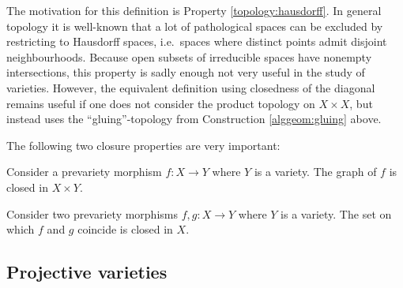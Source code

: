     \begin{remark}
        The motivation for this definition is Property \ref{topology:hausdorff}. In general topology it is well-known that a lot of pathological spaces can be excluded by restricting to Hausdorff spaces, i.e.~spaces where distinct points admit disjoint neighbourhoods. Because open subsets of irreducible spaces have nonempty intersections, this property is sadly enough not very useful in the study of varieties. However, the equivalent definition using closedness of the diagonal remains useful if one does not consider the product topology on $X\times X$, but instead uses the ``gluing''-topology from Construction \ref{alggeom:gluing} above.
    \end{remark}

    The following two closure properties are very important:
    \begin{property}\label{alggeom:closed_graph}
        Consider a prevariety morphism $f:X\rightarrow Y$ where $Y$ is a variety. The graph of $f$ is closed in $X\times Y$.
    \end{property}
    \begin{property}
        Consider two prevariety morphisms $f,g:X\rightarrow Y$ where $Y$ is a variety. The set on which $f$ and $g$ coincide is closed in $X$.
    \end{property}

\subsection{Projective varieties}



